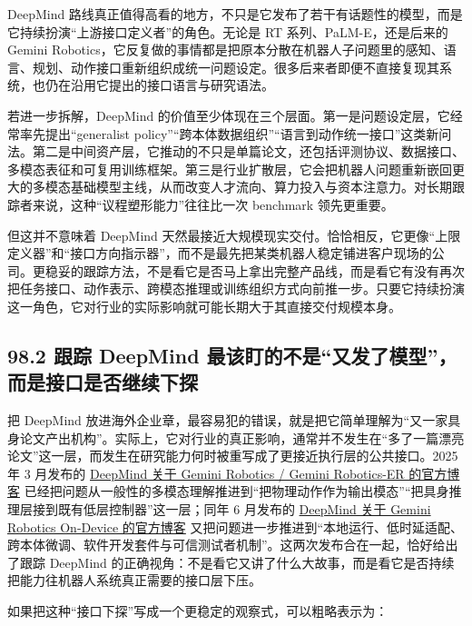 DeepMind 路线真正值得高看的地方，不只是它发布了若干有话题性的模型，而是它持续扮演“上游接口定义者”的角色。无论是 RT 系列、PaLM-E，还是后来的 Gemini Robotics，它反复做的事情都是把原本分散在机器人子问题里的感知、语言、规划、动作接口重新组织成统一问题设定。很多后来者即便不直接复现其系统，也仍在沿用它提出的接口语言与研究语法。

若进一步拆解，DeepMind 的价值至少体现在三个层面。第一是问题设定层，它经常率先提出“generalist policy”“跨本体数据组织”“语言到动作统一接口”这类新问法。第二是中间资产层，它推动的不只是单篇论文，还包括评测协议、数据接口、多模态表征和可复用训练框架。第三是行业扩散层，它会把机器人问题重新嵌回更大的多模态基础模型主线，从而改变人才流向、算力投入与资本注意力。对长期跟踪者来说，这种“议程塑形能力”往往比一次 benchmark 领先更重要。

但这并不意味着 DeepMind 天然最接近大规模现实交付。恰恰相反，它更像“上限定义器”和“接口方向指示器”，而不是最先把某类机器人稳定铺进客户现场的公司。更稳妥的跟踪方法，不是看它是否马上拿出完整产品线，而是看它有没有再次把任务接口、动作表示、跨模态推理或训练组织方式向前推一步。只要它持续扮演这一角色，它对行业的实际影响就可能长期大于其直接交付规模本身。

\subsection*{98.2 跟踪 DeepMind 最该盯的不是“又发了模型”，而是接口是否继续下探}


把 DeepMind 放进海外企业章，最容易犯的错误，就是把它简单理解为“又一家具身论文产出机构”。实际上，它对行业的真正影响，通常并不发生在“多了一篇漂亮论文”这一层，而发生在研究能力何时被重写成了更接近执行层的公共接口。2025 年 3 月发布的 \href{https://deepmind.google/blog/gemini-robotics-brings-ai-into-the-physical-world/}{DeepMind 关于 Gemini Robotics / Gemini Robotics-ER 的官方博客} 已经把问题从一般性的多模态理解推进到“把物理动作作为输出模态”“把具身推理层接到既有低层控制器”这一层；同年 6 月发布的 \href{https://deepmind.google/blog/gemini-robotics-on-device-brings-ai-to-local-robotic-devices/}{DeepMind 关于 Gemini Robotics On-Device 的官方博客} 又把问题进一步推进到“本地运行、低时延适配、跨本体微调、软件开发套件与可信测试者机制”。这两次发布合在一起，恰好给出了跟踪 DeepMind 的正确视角：不是看它又讲了什么大故事，而是看它是否持续把能力往机器人系统真正需要的接口层下压。

如果把这种“接口下探”写成一个更稳定的观察式，可以粗略表示为：


